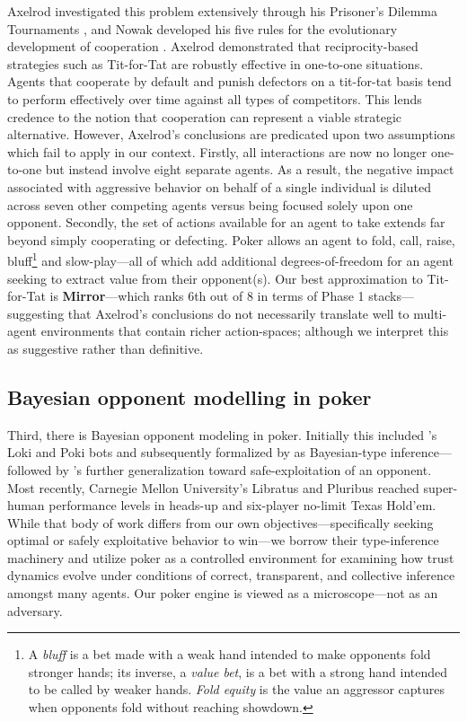 \documentclass[10pt]{article} %
\newcommand{\arch}[1]{\textbf{#1}}
\begin{document}
Axelrod investigated this problem extensively through his Prisoner's
Dilemma Tournaments \citep{axelrod1984evolution}, and Nowak
developed his five rules for the evolutionary development of
cooperation \citep{nowak2006five}. Axelrod demonstrated that
reciprocity-based strategies such as Tit-for-Tat are robustly
effective in one-to-one situations. Agents that cooperate by default
and punish defectors on a tit-for-tat basis tend to perform
effectively over time against all types of competitors. This lends
credence to the notion that cooperation can represent a viable
strategic alternative. However, Axelrod's conclusions are predicated
upon two assumptions which fail to apply in our context. Firstly,
all interactions are now no longer one-to-one but instead involve
eight separate agents. As a result, the negative impact associated
with aggressive behavior on behalf of a single individual is diluted
across seven other competing agents versus being focused solely upon
one opponent. Secondly, the set of actions available for an agent to
take extends far beyond simply cooperating or defecting. Poker
allows an agent to fold, call, raise,
bluff\footnote{A \textit{bluff} is a bet made with a weak hand
intended to make opponents fold stronger hands; its inverse, a
\textit{value bet}, is a bet with a strong hand intended to be
called by weaker hands. \textit{Fold equity} is the value an
aggressor captures when opponents fold without reaching showdown.}
and slow-play---all of which add additional degrees-of-freedom for
an agent seeking to extract value from their opponent(s). Our best
approximation to Tit-for-Tat is \arch{Mirror}---which ranks 6th out
of 8 in terms of Phase 1 stacks---suggesting that Axelrod's conclusions do
not necessarily translate well to multi-agent environments that
contain richer action-spaces; although we interpret this as
suggestive rather than definitive.

\subsection{Bayesian opponent modelling in poker}
Third, there is Bayesian opponent modeling in poker. Initially
this included \citeauthor{billings1998opponent}'s Loki and Poki bots
\citeyearpar{billings1998opponent} and subsequently formalized by
\citet{southey2005bayes} as Bayesian-type inference---
followed by \citeauthor{ganzfried2015safe}'s \citeyearpar{ganzfried2015safe}
further generalization toward safe-exploitation of an opponent. Most
recently, Carnegie Mellon University's Libratus and Pluribus
\citep{brown2018superhuman,brown2019superhuman} reached super-human
performance levels in heads-up and six-player no-limit Texas
Hold'em. While that body of work differs from our own
objectives---specifically seeking optimal or safely exploitative
behavior to win---we borrow their type-inference machinery and
utilize poker as a controlled environment for examining how trust
dynamics evolve under conditions of correct, transparent, and
collective inference amongst many agents. Our poker engine is viewed
as a microscope---not as an adversary.
\end{document}
